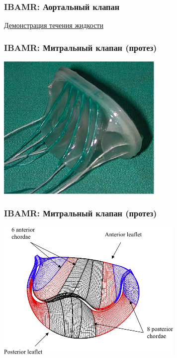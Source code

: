 \documentclass[14pt]{beamer}
\begin{document}
\begin{frame}
\frametitle{IBAMR: Аортальный клапан}
    \begin{center}
        \href{run:video/valve\_flow\_side.mov}{Демонстрация течения жидкости}
    \end{center}
\end{frame}

\begin{frame}
\frametitle{IBAMR: Митральный клапан (протез)}
    \begin{center}
    \includegraphics[width=8cm]{immersed_boundary/prosthetic_MV.jpeg}
    \end{center}
\end{frame}

\begin{frame}
\frametitle{IBAMR: Митральный клапан (протез)}
    \begin{center}
    \includegraphics[width=9cm]{immersed_boundary/MV_mesh.jpeg}
    \end{center}
\end{frame}
\end{document}
